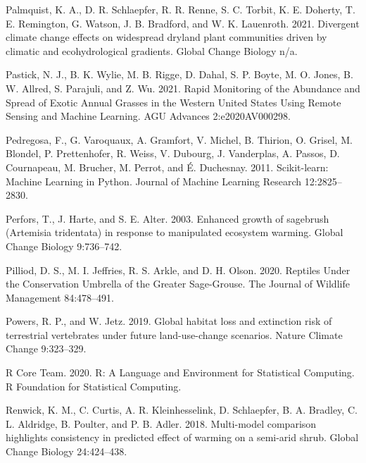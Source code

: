 \documentclass[
  12pt,
]{article}
\newlength{\cslhangindent}
\newenvironment{CSLReferences}[2] %
 {%
  \setlength{\parindent}{0pt}
  \ifodd #1 \everypar{\setlength{\hangindent}{\cslhangindent}}\ignorespaces\fi
  \ifnum #2 > 0
  \setlength{\parskip}{#2\baselineskip}
  \fi
 }%
 {}
\begin{document}
\begin{CSLReferences}{1}{0}
\leavevmode{}%
Palmquist, K. A., D. R. Schlaepfer, R. R. Renne, S. C. Torbit, K. E. Doherty, T. E. Remington, G. Watson, J. B. Bradford, and W. K. Lauenroth. 2021. Divergent climate change effects on widespread dryland plant communities driven by climatic and ecohydrological gradients. Global Change Biology n/a.

\leavevmode{}%
Pastick, N. J., B. K. Wylie, M. B. Rigge, D. Dahal, S. P. Boyte, M. O. Jones, B. W. Allred, S. Parajuli, and Z. Wu. 2021. Rapid {Monitoring} of the {Abundance} and {Spread} of {Exotic} {Annual} {Grasses} in the {Western} {United} {States} {Using} {Remote} {Sensing} and {Machine} {Learning}. AGU Advances 2:e2020AV000298.

\leavevmode{}%
Pedregosa, F., G. Varoquaux, A. Gramfort, V. Michel, B. Thirion, O. Grisel, M. Blondel, P. Prettenhofer, R. Weiss, V. Dubourg, J. Vanderplas, A. Passos, D. Cournapeau, M. Brucher, M. Perrot, and É. Duchesnay. 2011. Scikit-learn: {Machine} {Learning} in {Python}. Journal of Machine Learning Research 12:2825--2830.

\leavevmode{}%
Perfors, T., J. Harte, and S. E. Alter. 2003. Enhanced growth of sagebrush ({Artemisia} tridentata) in response to manipulated ecosystem warming. Global Change Biology 9:736--742.

\leavevmode{}%
Pilliod, D. S., M. I. Jeffries, R. S. Arkle, and D. H. Olson. 2020. Reptiles {Under} the {Conservation} {Umbrella} of the {Greater} {Sage}-{Grouse}. The Journal of Wildlife Management 84:478--491.

\leavevmode{}%
Powers, R. P., and W. Jetz. 2019. Global habitat loss and extinction risk of terrestrial vertebrates under future land-use-change scenarios. Nature Climate Change 9:323--329.

\leavevmode{}%
R Core Team. 2020. R: {A} {Language} and {Environment} for {Statistical} {Computing}. R Foundation for Statistical Computing.

\leavevmode{}%
Renwick, K. M., C. Curtis, A. R. Kleinhesselink, D. Schlaepfer, B. A. Bradley, C. L. Aldridge, B. Poulter, and P. B. Adler. 2018. Multi-model comparison highlights consistency in predicted effect of warming on a semi-arid shrub. Global Change Biology 24:424--438.


\end{CSLReferences}
\end{document}
